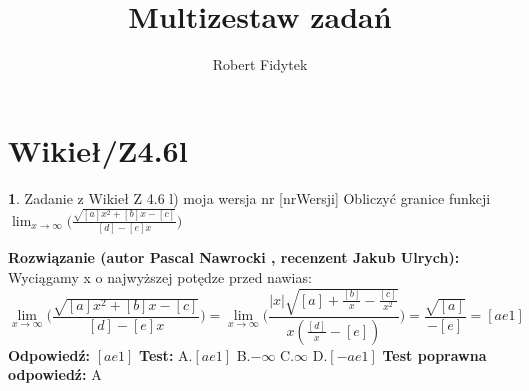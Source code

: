 \documentclass[12pt, a4paper]{article}
\title{Multizestaw zadań}
\author{Robert Fidytek}
\date{}
\theoremstyle{definition} %
\newtheorem{zad}{}
\newcommand{\kategoria}[1]{\section{#1}} %
\newcommand{\zadStart}[1]{\begin{zad}#1\newline} %
\newcommand{\zadStop}{\end{zad}}   %
\newcommand{\rozwStart}[2]{\noindent \textbf{Rozwiązanie (autor #1 , recenzent #2): }\newline} %
\newcommand{\rozwStop}{\newline}                                            %
\newcommand{\odpStart}{\noindent \textbf{Odpowiedź:}\newline}    %
\newcommand{\odpStop}{\newline}                                             %
\newcommand{\testStart}{\noindent \textbf{Test:}\newline} %
\newcommand{\testStop}{\newline} %
\newcommand{\kluczStart}{\noindent \textbf{Test poprawna odpowiedź:}\newline} %
\newcommand{\kluczStop}{\newline} %
\begin{document}
\maketitle


\kategoria{Wikieł/Z4.6l}
\zadStart{Zadanie z Wikieł Z 4.6 l) moja wersja nr [nrWersji]}
Obliczyć granice funkcji $\displaystyle{\lim_{x \to \infty}}\bigg(\frac{\sqrt{[a]x^2+[b]x-[c]}}{[d]-[e]x}\bigg)$
\zadStop
\rozwStart{Pascal Nawrocki}{Jakub Ulrych}
Wyciągamy x o najwyższej potędze przed nawias:
$$\displaystyle{\lim_{x \to \infty}}\bigg(\frac{\sqrt{[a]x^2+[b]x-[c]}}{[d]-[e]x}\bigg)=\displaystyle{\lim_{x \to \infty}}\bigg(\frac{|x|\sqrt{[a]+\frac{[b]}{x}-\frac{[c]}{x^2}}}{x(\frac{[d]}{x}-[e])}\bigg)=\frac{\sqrt{[a]}}{-[e]}=[ae1]$$
\rozwStop
\odpStart
$[ae1]$
\odpStop
\testStart
A.$[ae1]$
B.$-\infty$
C.$\infty$
D.$[-ae1]$
\testStop
\kluczStart
A
\kluczStop
\end{document}
